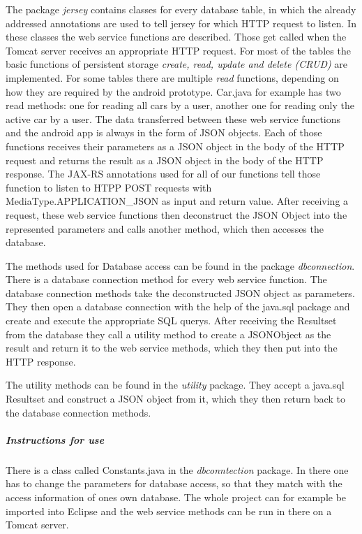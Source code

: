 The package \textit{jersey} contains classes for every database table, in which the already addressed annotations are used to tell jersey for which HTTP request to listen. In these classes the web service functions are described. Those get called when the Tomcat server receives an appropriate HTTP request. For most of the tables the basic functions of persistent storage \textit{create, read, update and delete (CRUD)} are implemented. For some tables there are multiple \textit{read} functions, depending on how they are required by the android prototype. Car.java for example has two read methods: one for reading all cars by a user, another one for reading only the active car by a user. The data transferred between these web service functions and the android app is always in the form of JSON objects. Each of those functions receives their parameters as a JSON object in the body of the HTTP request and returns the result as a JSON object in the body of the HTTP response. The JAX-RS annotations used for all of our functions tell those function to listen to HTPP POST requests with MediaType.APPLICATION\_JSON as input and return value. After receiving a request, these web service functions then deconstruct the JSON Object into the represented parameters and calls another method, which then accesses the database.

The methods used for Database access can be found in the package \textit{dbconnection}. There is a database connection method for every web service function. The database connection methods take the deconstructed JSON object as parameters. They then open a database connection with the help of the java.sql package and create and execute the appropriate SQL querys. After receiving the Resultset from the database they call a utility method to create a JSONObject as the result and return it to the web service methods, which they then put into the HTTP response.

The utility methods can be found in the \textit{utility} package. They accept a java.sql Resultset and construct a JSON object from it, which they then return back to the database connection methods. 

\subparagraph{Instructions for use}
There is a class called Constants.java in the \textit{dbconntection} package. In there one has to change the parameters for database access, so that they match with the access information of ones own database. The whole project can for example be imported into Eclipse and the web service methods can be run in there on a Tomcat server.

